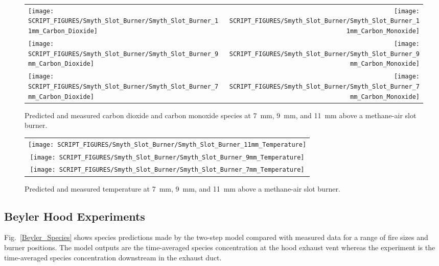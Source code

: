 \begin{figure}[p]
\begin{tabular*}{\textwidth}{l@{\extracolsep{\fill}}r}
\texttt{[image: SCRIPT\_FIGURES/Smyth\_Slot\_Burner/Smyth\_Slot\_Burner\_11mm\_Carbon\_Dioxide]} &
\texttt{[image: SCRIPT\_FIGURES/Smyth\_Slot\_Burner/Smyth\_Slot\_Burner\_11mm\_Carbon\_Monoxide]} \\
\texttt{[image: SCRIPT\_FIGURES/Smyth\_Slot\_Burner/Smyth\_Slot\_Burner\_9mm\_Carbon\_Dioxide]} &
\texttt{[image: SCRIPT\_FIGURES/Smyth\_Slot\_Burner/Smyth\_Slot\_Burner\_9mm\_Carbon\_Monoxide]} \\
\texttt{[image: SCRIPT\_FIGURES/Smyth\_Slot\_Burner/Smyth\_Slot\_Burner\_7mm\_Carbon\_Dioxide]} &
\texttt{[image: SCRIPT\_FIGURES/Smyth\_Slot\_Burner/Smyth\_Slot\_Burner\_7mm\_Carbon\_Monoxide]}
\end{tabular*}
\caption[Species predictions at 7~mm, 9~mm, and 11~mm above burner, Smyth experiment]
{Predicted and measured carbon dioxide and carbon monoxide species at 7~mm, 9~mm, and 11~mm above a methane-air slot burner.}
\label{Smyth_Slot_Burner_co_co2}
\end{figure}

\begin{figure}[p]
\centering
\begin{tabular}{c}
\texttt{[image: SCRIPT\_FIGURES/Smyth\_Slot\_Burner/Smyth\_Slot\_Burner\_11mm\_Temperature]} \\
\texttt{[image: SCRIPT\_FIGURES/Smyth\_Slot\_Burner/Smyth\_Slot\_Burner\_9mm\_Temperature]} \\
\texttt{[image: SCRIPT\_FIGURES/Smyth\_Slot\_Burner/Smyth\_Slot\_Burner\_7mm\_Temperature]}
\end{tabular}
\caption[Temperature predictions at 7~mm, 9~mm, and 11~mm above burner, Smyth experiment]
{Predicted and measured temperature at 7~mm, 9~mm, and 11~mm above a methane-air slot burner.}
\label{Smyth_Slot_Burner_temp}
\end{figure}

\clearpage

\subsection{Beyler Hood Experiments}

Fig.~\ref{Beyler_Species} shows species predictions made by the two-step model compared with measured data for a range of fire sizes and burner positions.  The model outputs are the time-averaged species concentration at the hood exhaust vent whereas the experiment is the time-averaged species concentration downstream in the exhaust duct.

